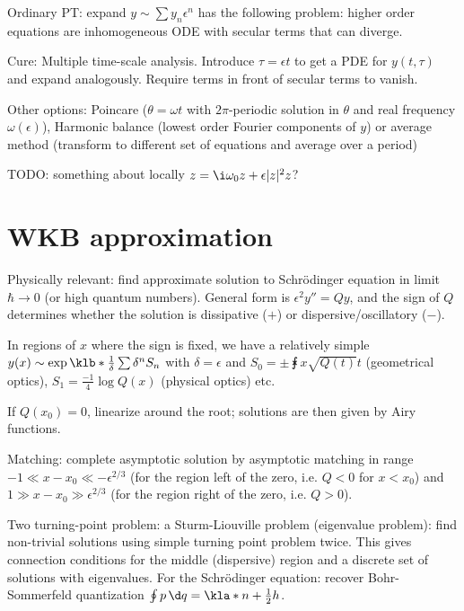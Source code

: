 \documentclass[english, parskip=full]{scrbook}
\begin{document}
Ordinary PT: expand $y\sim \sum y_n\epsilon^n$ has the following problem: higher order equations are inhomogeneous ODE with secular terms that can diverge.

Cure: Multiple time-scale analysis.
Introduce $\tau = \epsilon t$ to get a PDE for $y(t,\tau)$ and expand analogously.
Require terms in front of secular terms to vanish.

Other options: Poincare ($\theta=\omega t$ with $2\pi$-periodic solution in $\theta$ and real frequency $\omega(\epsilon)$), Harmonic balance (lowest order Fourier components of $y$) or average method (transform to different set of equations and average over a period)

TODO: something about locally $z=\i\omega_0 z + \epsilon |z|^2 z$?
\section{WKB approximation}
Physically relevant: find approximate solution to Schrödinger equation in limit $\hbar\rightarrow 0$ (or high quantum numbers).
General form is $\epsilon^2y''=Qy$, and the sign of $Q$ determines whether the solution is dissipative ($+$) or dispersive/oscillatory ($-$).

In regions of $x$ where the sign is fixed, we have a relatively simple $y(x) \sim \exp\klb*{\frac{1}{\delta} \sum \delta^n S_n}$ with $\delta=\epsilon$ and $S_0=\pm \intx{ }{x}{\sqrt{Q(t)}}{t}$ (geometrical optics), $S_1=\frac{-1}{4}\log Q(x)$ (physical optics) etc.

If $Q(x_0)=0$, linearize around the root; solutions are then given by Airy functions.

Matching: complete asymptotic solution by asymptotic matching in range $-1\ll x-x_0 \ll -\epsilon^{2/3}$ (for the region left of the zero, i.e. $Q<0$ for $x<x_0$) and $1\gg x-x_0 \gg \epsilon^{2/3}$ (for the region right of the zero, i.e. $Q>0$).

Two turning-point problem: a Sturm-Liouville problem (eigenvalue problem): find non-trivial solutions using simple turning point problem twice.
This gives connection conditions for the middle (dispersive) region and a discrete set of solutions with eigenvalues.
For the Schrödinger equation: recover Bohr-Sommerfeld quantization $\oint p\,\d q = \kla*{n+\frac{1}{2}}h$.
\end{document}
